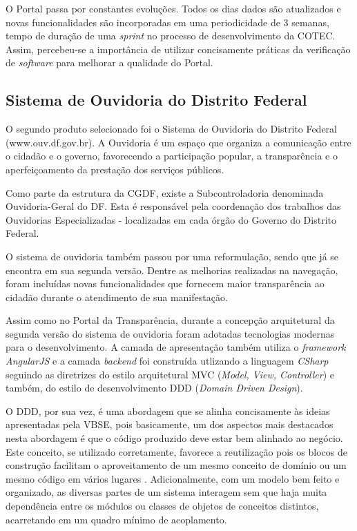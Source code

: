 O Portal passa por constantes evoluções. Todos os dias dados são atualizados e novas funcionalidades são incorporadas em uma periodicidade de 3 semanas, tempo de duração de uma \textit{sprint} no processo de desenvolvimento da COTEC. Assim, percebeu-se a importância de utilizar concisamente práticas da verificação de \textit{software} para melhorar a qualidade do Portal.

\subsection{Sistema de Ouvidoria do Distrito Federal}

O segundo produto selecionado foi o Sistema de Ouvidoria do Distrito Federal (www.ouv.df.gov.br). A Ouvidoria é um espaço que organiza a comunicação entre o cidadão e o governo, favorecendo a participação popular, a transparência e o aperfeiçoamento da prestação dos serviços públicos.

Como parte da estrutura da CGDF, existe a Subcontroladoria denominada Ouvidoria-Geral do DF. Esta é responsável pela coordenação dos trabalhos das Ouvidorias Especializadas - localizadas em cada órgão do Governo do Distrito Federal.

O sistema de ouvidoria também passou por uma reformulação, sendo que já se encontra em sua segunda versão. Dentre as melhorias realizadas na navegação, foram incluídas novas funcionalidades que fornecem maior transparência ao cidadão durante o atendimento de sua manifestação.

Assim como no Portal da Transparência, durante a concepção arquitetural da segunda versão do sistema de ouvidoria foram adotadas tecnologias modernas para o desenvolvimento. A camada de apresentação também utiliza o \textit{framework AngularJS} e a camada \textit{backend} foi construída utlizando a linguagem \textit{CSharp} seguindo as diretrizes do estilo arquitetural MVC (\textit{Model, View, Controller}) e também, do estilo de desenvolvimento DDD (\textit{Domain Driven Design}).

O DDD, por sua vez, é uma abordagem que se alinha concisamente às ideias apresentadas pela VBSE, pois basicamente, um dos aspectos mais destacados nesta abordagem é que o código produzido deve estar bem alinhado ao negócio. Este conceito, se utilizado corretamente, favorece a reutilização pois os blocos de construção facilitam o aproveitamento de um mesmo conceito de domínio ou um mesmo código em vários lugares \cite{ddd}. Adicionalmente, com um modelo bem feito e organizado, as diversas partes de um sistema interagem sem que haja muita dependência entre os módulos ou classes de objetos de conceitos distintos, acarretando em um quadro mínimo de acoplamento.

